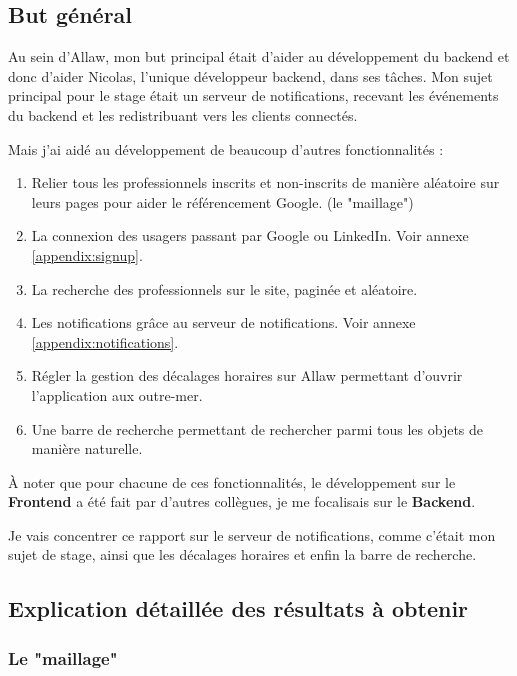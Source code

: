 
\subsection{But général}

Au sein d'Allaw, mon but principal était d'aider au développement du backend
et donc d'aider Nicolas, l'unique développeur backend, dans ses tâches. Mon
sujet principal pour le stage était un serveur de notifications, recevant les
événements du backend et les redistribuant vers les clients connectés.

Mais j'ai aidé au développement de beaucoup d'autres fonctionnalités :

\begin{enumerate}
    \item Relier tous les professionnels inscrits et non-inscrits de manière aléatoire sur
          leurs pages pour aider le référencement Google. (le "maillage")
	\item La connexion des usagers passant par Google ou LinkedIn. Voir annexe \ref{appendix:signup}.
    \item La recherche des professionnels sur le site, paginée et aléatoire.
	\item Les notifications grâce au serveur de notifications. Voir annexe \ref{appendix:notifications}.
	\item Régler la gestion des décalages horaires sur Allaw permettant d'ouvrir l'application aux outre-mer.
	\item Une barre de recherche permettant de rechercher parmi tous les objets de manière naturelle.
\end{enumerate}

À noter que pour chacune de ces fonctionnalités, le développement sur le {\bf
Frontend} a été fait par d'autres collègues, je me focalisais sur le {\bf
Backend}.

Je vais concentrer ce rapport sur le serveur de notifications, comme c'était mon
sujet de stage, ainsi que les décalages horaires et enfin la barre de recherche.

\subsection{Explication détaillée des résultats à obtenir}

\subsubsection{Le "maillage"}

